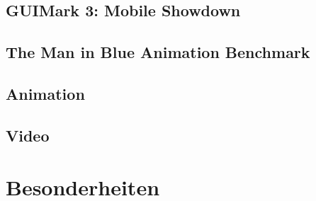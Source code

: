\subsection{GUIMark 3: Mobile Showdown}

\subsection{The Man in Blue Animation Benchmark}

\subsection{Animation}

\subsection{Video}

\section{Besonderheiten}

